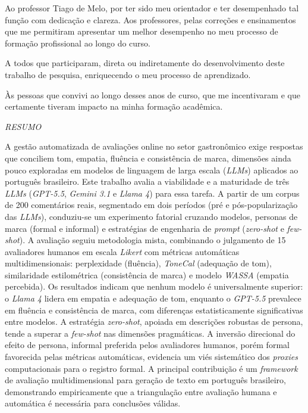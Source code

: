 \documentclass[12pt, a4paper]{article}
\numberwithin{equation}{section}
\begin{document}
Ao professor Tiago de Melo, por ter sido meu orientador e ter desempenhado tal função com dedicação e clareza.
Aos professores, pelas correções e ensinamentos que me permitiram apresentar um melhor desempenho no meu processo de formação profissional ao longo do curso.

A todos que participaram, direta ou indiretamente do desenvolvimento deste trabalho de pesquisa, enriquecendo o meu processo de aprendizado.

Às pessoas que convivi ao longo desses anos de curso, que me incentivaram e que certamente tiveram impacto na minha formação acadêmica.

\hspace*{0.8cm}

\newpage
\thispagestyle{empty}
{\begin{center}\textit{\normalsize RESUMO}\vspace{36pt}\end{center}}

A gestão automatizada de avaliações online no setor gastronômico exige respostas que conciliem tom, empatia, fluência e consistência de marca, dimensões ainda pouco exploradas em modelos de linguagem de larga escala (\textit{LLMs}) aplicados ao português brasileiro. Este trabalho avalia a viabilidade e a maturidade de três \textit{LLMs} (\textit{GPT-5.5}, \textit{Gemini 3.1} e \textit{Llama 4}) para essa tarefa. A partir de um corpus de 200 comentários reais, segmentado em dois períodos (pré e pós-popularização das \textit{LLMs}), conduziu-se um experimento fatorial cruzando modelos, personas de marca (formal e informal) e estratégias de engenharia de \textit{prompt} (\textit{zero-shot} e \textit{few-shot}). A avaliação seguiu metodologia mista, combinando o julgamento de 15 avaliadores humanos em escala \textit{Likert} com métricas automáticas multidimensionais: perplexidade (fluência), \textit{ToneCal} (adequação de tom), similaridade estilométrica (consistência de marca) e modelo \textit{WASSA} (empatia percebida). Os resultados indicam que nenhum modelo é universalmente superior: o \textit{Llama 4} lidera em empatia e adequação de tom, enquanto o \textit{GPT-5.5} prevalece em fluência e consistência de marca, com diferenças estatisticamente significativas entre modelos. A estratégia \textit{zero-shot}, apoiada em descrições robustas de persona, tende a superar a \textit{few-shot} nas dimensões pragmáticas. A inversão direcional do efeito de persona, informal preferida pelos avaliadores humanos, porém formal favorecida pelas métricas automáticas, evidencia um viés sistemático dos \textit{proxies} computacionais para o registro formal. A principal contribuição é um \textit{framework} de avaliação multidimensional para geração de texto em português brasileiro, demonstrando empiricamente que a triangulação entre avaliação humana e automática é necessária para conclusões válidas.
\end{document}
